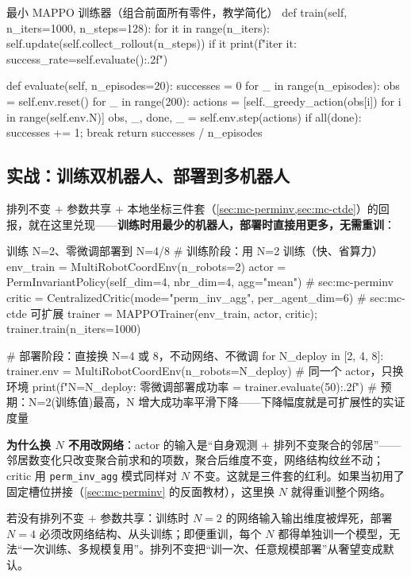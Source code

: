 \begin{codebox}[Python]{最小 MAPPO 训练器（组合前面所有零件，教学简化）}
    def train(self, n_iters=1000, n_steps=128):
        for it in range(n_iters):
            self.update(self.collect_rollout(n_steps))
            if it %
                print(f"iter {it}: success_rate={self.evaluate():.2f}")

    def evaluate(self, n_episodes=20):
        successes = 0
        for _ in range(n_episodes):
            obs = self.env.reset()
            for _ in range(200):
                actions = [self._greedy_action(obs[i]) for i in range(self.env.N)]
                obs, _, done, _ = self.env.step(actions)
                if all(done): successes += 1; break
        return successes / n_episodes
\end{codebox}

\subsection{实战：训练双机器人、部署到多机器人}
\label{sec:mc-train-deploy}

排列不变 $+$ 参数共享 $+$ 本地坐标三件套（\cref{sec:mc-perminv,sec:mc-ctde}）的回报，就在这里兑现——\textbf{训练时用最少的机器人，部署时直接用更多，无需重训}：

\begin{codebox}[Python]{训练 N=2、零微调部署到 N=4/8}
# 训练阶段：用 N=2 训练（快、省算力）
env_train = MultiRobotCoordEnv(n_robots=2)
actor  = PermInvariantPolicy(self_dim=4, nbr_dim=4, agg="mean")    # sec:mc-perminv
critic = CentralizedCritic(mode="perm_inv_agg", per_agent_dim=6)   # sec:mc-ctde 可扩展
trainer = MAPPOTrainer(env_train, actor, critic); trainer.train(n_iters=1000)

# 部署阶段：直接换 N=4 或 8，不动网络、不微调
for N_deploy in [2, 4, 8]:
    trainer.env = MultiRobotCoordEnv(n_robots=N_deploy)            # 同一个 actor，只换环境
    print(f"N={N_deploy}: 零微调部署成功率 = {trainer.evaluate(50):.2f}")
    # 预期：N=2(训练值)最高，N 增大成功率平滑下降——下降幅度就是可扩展性的实证度量
\end{codebox}

\textbf{为什么换 $N$ 不用改网络}：actor 的输入是“自身观测 $+$ 排列不变聚合的邻居”——邻居数变化只改变聚合前求和的项数，聚合后维度不变，网络结构纹丝不动；critic 用 \verb|perm_inv_agg| 模式同样对 $N$ 不变。这就是三件套的红利。如果当初用了固定槽位拼接（\cref{sec:mc-perminv} 的反面教材），这里换 $N$ 就得重训整个网络。

\begin{insight}
若没有排列不变 $+$ 参数共享：训练时 $N{=}2$ 的网络输入输出维度被焊死，部署 $N{=}4$ 必须改网络结构、从头训练；即便重训，每个 $N$ 都得单独训一个模型，无法“一次训练、多规模复用”。排列不变把“训一次、任意规模部署”从奢望变成默认。
\end{insight}

